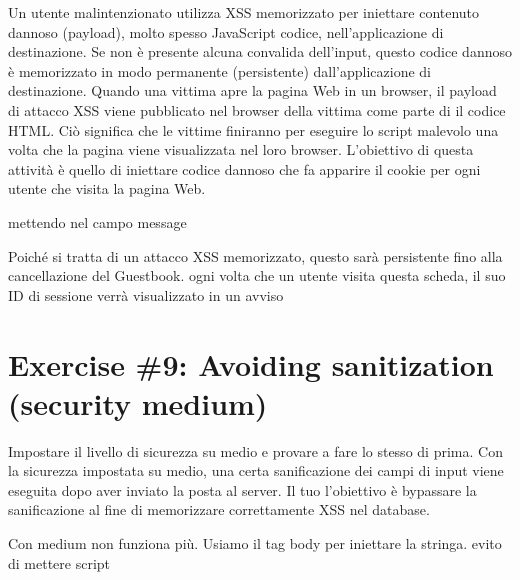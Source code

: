 \documentclass[11pt]{article}
\begin{document}
    Un utente malintenzionato utilizza XSS memorizzato per iniettare
contenuto dannoso (payload), molto spesso JavaScript codice,
nell'applicazione di destinazione. Se non è presente alcuna convalida
dell'input, questo codice dannoso è memorizzato in modo permanente
(persistente) dall'applicazione di destinazione. Quando una vittima apre
la pagina Web in un browser, il payload di attacco XSS viene pubblicato
nel browser della vittima come parte di il codice HTML. Ciò significa
che le vittime finiranno per eseguire lo script malevolo una volta che
la pagina viene visualizzata nel loro browser. L'obiettivo di questa
attività è quello di iniettare codice dannoso che fa apparire il cookie
per ogni utente che visita la pagina Web.

    mettendo nel campo message

Poiché si tratta di un attacco XSS memorizzato, questo sarà persistente
fino alla cancellazione del Guestbook. ogni volta che un utente visita
questa scheda, il suo ID di sessione verrà visualizzato in un avviso

    \hypertarget{exercise-9-avoiding-sanitization-security-medium}{%
\section{Exercise \#9: Avoiding sanitization (security
medium)}\label{exercise-9-avoiding-sanitization-security-medium}}

    Impostare il livello di sicurezza su medio e provare a fare lo stesso di
prima. Con la sicurezza impostata su medio, una certa sanificazione dei
campi di input viene eseguita dopo aver inviato la posta al server. Il
tuo l'obiettivo è bypassare la sanificazione al fine di memorizzare
correttamente XSS nel database.

    Con medium non funziona più. Usiamo il tag body per iniettare la
stringa. evito di mettere script


    
    
    
    
\end{document}
